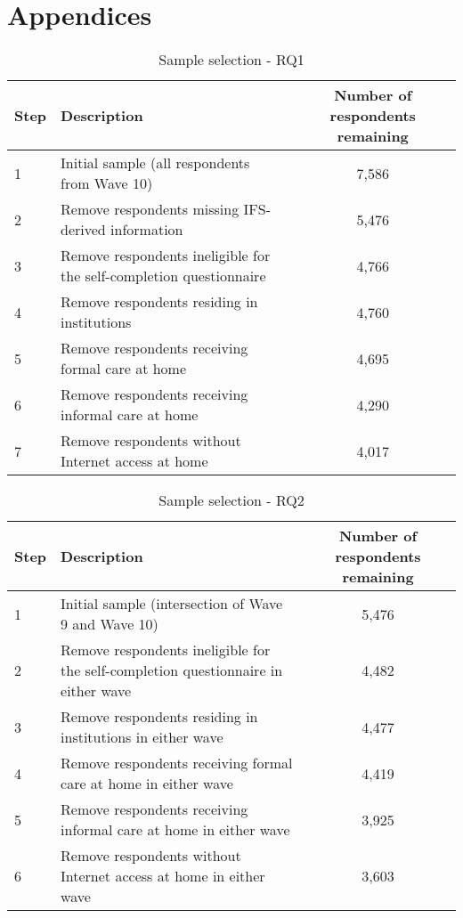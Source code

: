 \chapter{\label{ch:appendix}Appendices}

\begin{table}[h!]
    \centering
    \caption{Sample selection - RQ1}
    \label{app:sample_selection_rq1}
    \begin{tabularx}{\textwidth}{lXc}
        \toprule
        Step & Description & Number of respondents remaining \\
        \midrule
        1 & Initial sample (all respondents from Wave 10) & 7,586 \\
        2 & Remove respondents missing IFS-derived information & 5,476 \\
        3 & Remove respondents ineligible for the self-completion questionnaire & 4,766 \\
        4 & Remove respondents residing in institutions & 4,760 \\
        5 & Remove respondents receiving formal care at home & 4,695 \\
        6 & Remove respondents receiving informal care at home & 4,290 \\
        7 & Remove respondents without Internet access at home & 4,017 \\
        \bottomrule
    \end{tabularx}
\end{table}

\begin{table}[h!]
    \centering
    \caption{Sample selection - RQ2}
    \label{app:sample_selection_rq2}
    \begin{tabularx}{\textwidth}{lXc}
        \toprule
        Step & Description & Number of respondents remaining \\
        \midrule
        1 & Initial sample (intersection of Wave 9 and Wave 10) & 5,476 \\
        2 & Remove respondents ineligible for the self-completion questionnaire in either wave & 4,482 \\
        3 & Remove respondents residing in institutions in either wave & 4,477 \\
        4 & Remove respondents receiving formal care at home in either wave & 4,419 \\
        5 & Remove respondents receiving informal care at home in either wave & 3,925 \\
        6 & Remove respondents without Internet access at home in either wave & 3,603 \\
        \bottomrule
    \end{tabularx}
\end{table}

